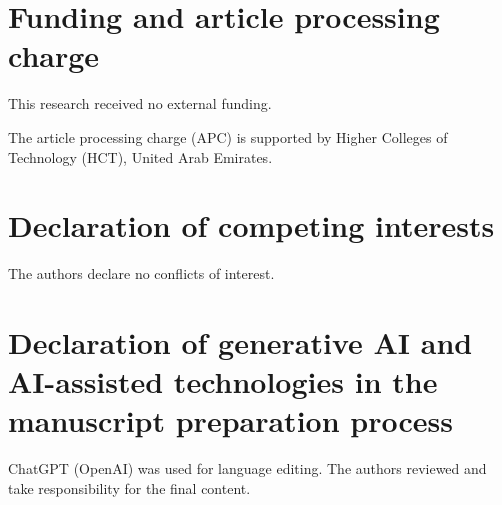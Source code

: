 \documentclass[preprint,12pt]{elsarticle}
\begin{document}
\section*{Funding and article processing charge}
This research received no external funding.

The article processing charge (APC) is supported by Higher Colleges of Technology (HCT), United Arab Emirates.

\section*{Declaration of competing interests}
The authors declare no conflicts of interest.

\section*{Declaration of generative AI and AI-assisted technologies in the manuscript preparation process}
ChatGPT (OpenAI) was used for language editing. The authors reviewed and take responsibility for the final content.
\end{document}
